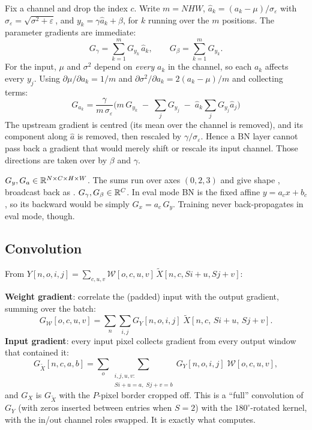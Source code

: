 \begin{idea}
Fix a channel and drop the index $c$. Write $m=NHW$, $\hat a_k=(a_k-\mu)/\sigma_\varepsilon$ with $\sigma_\varepsilon=\sqrt{\sigma^2+\varepsilon}$, and $y_k=\gamma\hat a_k+\beta$, for $k$ running over the $m$ positions. The parameter gradients are immediate:
\[
  G_\gamma = \sum_{k=1}^m G_{y_k}\,\hat a_k, \qquad G_\beta = \sum_{k=1}^m G_{y_k}.
\]
For the input, $\mu$ and $\sigma^2$ depend on \emph{every} $a_k$ in the channel, so each $a_k$ affects every $y_j$. Using $\partial\mu/\partial a_k = 1/m$ and $\partial\sigma^2/\partial a_k = 2(a_k-\mu)/m$ and collecting terms:
\[
  \boxed{\;G_{a_k} = \frac{\gamma}{m\,\sigma_\varepsilon}\Big(m\,G_{y_k} \;-\; \sum_{j}G_{y_j} \;-\; \hat a_k\sum_j G_{y_j}\hat a_j\Big)\;}
\]
The upstream gradient is centred (its mean over the channel is removed), and its component along $\hat a$ is removed, then rescaled by $\gamma/\sigma_\varepsilon$. Hence a BN layer cannot pass back a gradient that would merely shift or rescale its input channel. Those directions are taken over by $\beta$ and $\gamma$.
\end{idea}

\begin{shapebox}[BN backward]
$G_y, G_a\in\mathbb{R}^{N\times C\times H\times W}$. The sums run over axes $(0,2,3)$ and give shape , broadcast back as . $G_\gamma,G_\beta\in\mathbb{R}^{C}$. In eval mode BN is the fixed affine $y=a_cx+b_c$, so its backward would be simply $G_x=a_c\,G_y$. Training never back-propagates in eval mode, though.
\end{shapebox}

\subsection{Convolution}
\label{sec:convback}

\begin{idea}
From $Y[n,o,i,j]=\sum_{c,u,v}\mathcal W[o,c,u,v]\,\tilde X[n,c,Si{+}u,Sj{+}v]$:

\textbf{Weight gradient}: correlate the (padded) input with the output gradient, summing over the batch:
\[
  G_\mathcal W[o,c,u,v] = \sum_{n}\sum_{i,j} G_Y[n,o,i,j]\;\tilde X[n,c,\,Si+u,\,Sj+v].
\]
\textbf{Input gradient}: every input pixel collects gradient from every output window that contained it:
\[
  G_{\tilde X}[n,c,a,b] = \sum_{o}\sum_{\substack{i,j,u,v:\\ Si+u=a,\;Sj+v=b}} G_Y[n,o,i,j]\;\mathcal W[o,c,u,v],
\]
and $G_X$ is $G_{\tilde X}$ with the $P$-pixel border cropped off. This is a ``full'' convolution of $G_Y$ (with zeros inserted between entries when $S=2$) with the $180^\circ$-rotated kernel, with the in/out channel roles swapped. It is exactly what  computes.
\end{idea}

